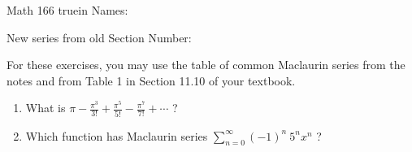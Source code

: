 \documentclass[12pt]{article}
\begin{document}
\pagestyle{empty} %

\noindent
{Math 166  truein  Names:\ \hrulefill}

\noindent
{New series from old}
\noindent \hspace{2.5in} Section Number: \hrulefill
\bigskip

For these exercises, you may use the table of common Maclaurin series from the notes and from Table 1 in Section 11.10 of your textbook.

\begin{enumerate}

\item What is $\pi -\displaystyle\frac{\pi^3}{3!}+\displaystyle\frac{\pi^5}{5!}-\displaystyle\frac{\pi^7}{7!}+\cdots$ ?

\vfill
\item Which function has Maclaurin series $\displaystyle\sum_{n=0}^{\infty} (-1)^n \ 5^n  x^n$ ?

\vfill















\end{enumerate}
\end{document}
